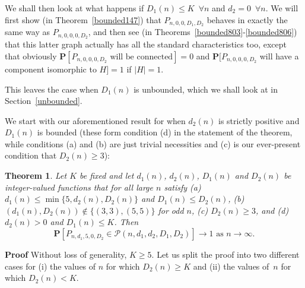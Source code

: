 \documentclass{article}
\newtheorem{Theorem}{Theorem}
\newtheorem{Proof of Theorem}{Proof of Theorem}
\begin{document}
We shall then look at what happens if $D_{1}(n) \leq K$~$\forall n$ and $d_{2}=0$~$\forall n$.
We will first show (in Theorem~\ref{bounded147}) that 
$P_{n,0,0,D_{1},D_{2}}$ behaves in exactly the same way as $P_{n,0,0,0,D_{2}}$,
and then see (in Theorems~\ref{bounded803}-\ref{bounded806})
that this latter graph actually has all the standard characteristics too,
except that obviously
$\mathbf{P}[P_{n,0,0,0,D_{2}} \textrm{ will be connected}]=0$
and $\mathbf{P}[P_{n,0,0,0,D_{2}}$ 
will have a component isomorphic to $H]=1$ if $|H|=1$.

This leaves the case when $D_{1}(n)$ is unbounded,
which we shall look at in Section~\ref{unbounded}. 





\begin{figure}[omitted: a diagram of this paper's results, not reproduced here]\end{figure}









We start with our aforementioned result for when $d_{2}(n)$ is strictly positive and $D_{1}(n)$ is bounded
(these form condition (d) in the statement of the theorem,
while conditions (a) and (b) are just trivial necessities 
and (c) is our ever-present condition that $D_{2}(n) \geq 3$):















\begin{Theorem} \label{bounded791}
Let $K$ be fixed
and let $d_{1}(n)$, $d_{2}(n)$, $D_{1}(n)$ and $D_{2}(n)$ be integer-valued functions 
that for all large $n$ satisfy
(a) $d_{1}(n) \leq \min \{ 5,d_{2}(n),D_{2}(n) \}$ and $D_{1}(n) \leq D_{2}(n)$,
(b) $(d_{1}(n), D_{2}(n)) \notin \{ (3,3),(5,5) \}$ for odd $n$,
(c) $D_{2}(n) \geq 3$,
and (d) $d_{2}(n) > 0$ and $D_{1}(n) \leq K$.
Then
\begin{displaymath}
\mathbf{P}[P_{n,d_{1},5,0,D_{2}} \in \mathcal{P}(n,d_{1},d_{2},D_{1},D_{2})] \to 1 \textrm{ as } n \to \infty.
\end{displaymath} 
\end{Theorem} 
\textbf{Proof}
Without loss of generality, $K \geq 5$.
Let us split the proof into two different cases for
(i) the values of $n$ for which $D_{2}(n) \geq K$
and (ii) the values of~$n$ for which $D_{2}(n) < K$.
\end{document}
